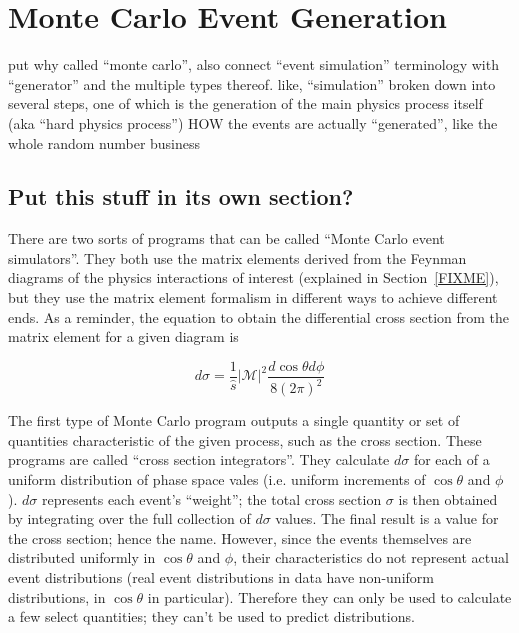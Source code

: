 \section{Monte Carlo Event Generation}
\label{sim:MC}
put why called ``monte carlo'', 
also connect ``event simulation'' terminology 
with ``generator'' and the multiple types thereof.
like, ``simulation'' broken down into several steps, 
one of which is the generation of the main 
physics process itself (aka ``hard physics process'')
HOW the events are actually ``generated'', 
like the whole random number business


\subsection{Put this stuff in its own section?}
\label{sim:MCexplain}




There are two sorts of programs that can be called 
``Monte Carlo event simulators''.  
They both use the matrix elements derived from 
the Feynman diagrams of the physics interactions of interest 
(explained in Section~\ref{FIXME}), %
but they use the matrix element formalism 
in different ways to achieve different ends.  
As a reminder, the equation to obtain the 
differential cross section %
from the matrix element for a given diagram is 

\[
d\sigma = \frac{1}{\hat{s}}|\mathcal{M}|^2 \frac{d \cos \theta d\phi}{8(2\pi)^2}
\]

The first type of Monte Carlo program outputs 
a single quantity or set of quantities characteristic 
of the given process, 
such as the cross section.  
These programs are called ``cross section integrators''.  
They calculate 
$d\sigma$ for each of a uniform distribution of 
phase space vales (i.e. uniform increments 
of $\cos\theta$ and $\phi$).  
$d\sigma$ represents each event's ``weight''; 
the total cross section $\sigma$ is then obtained 
by integrating over the full collection of $d\sigma$ values.  
The final result is a value for the cross section; 
hence the name.  
However, since the events themselves are distributed 
uniformly in $\cos\theta$ and $\phi$, 
their characteristics 
do not represent actual event distributions 
(real event distributions in data have 
non-uniform distributions, 
in $\cos\theta$ in particular).  
Therefore they can only be used to calculate 
a few select quantities; 
they can't be used to predict distributions.  

